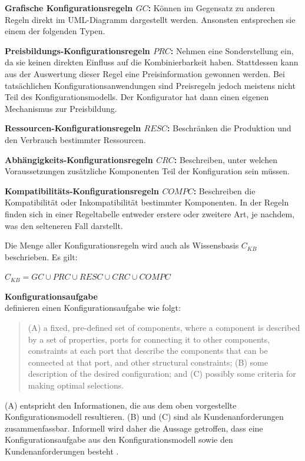 \documentclass[12pt,a4paper,bibliography=totocnumbered,listof=totoc]{scrartcl}
\begin{document}
\begin{compactitem}
\item \textbf{Grafische Konfigurationsregeln $GC$:} Können im Gegensatz zu anderen Regeln direkt im UML-Diagramm dargestellt werden. Ansonsten entsprechen sie einem der folgenden Typen.
\item \textbf{Preisbildungs-Konfigurationsregeln $PRC$:} Nehmen eine Sonderstellung ein, da sie keinen direkten Einfluss auf die Kombinierbarkeit haben. Stattdessen kann aus der Auswertung dieser Regel eine Preisinformation gewonnen werden. Bei tatsächlichen Konfigurationsanwendungen sind Preisregeln jedoch meistens nicht Teil des Konfigurationsmodells. Der Konfigurator hat dann einen eigenen Mechanismus zur Preisbildung.
\item \textbf{Ressourcen-Konfigurationsregeln $RESC$:} Beschränken die Produktion und den Verbrauch bestimmter Ressourcen.
\item \textbf{Abhängigkeits-Konfigurationsregeln $CRC$:} Beschreiben, unter welchen Voraussetzungen zusätzliche Komponenten Teil der Konfiguration sein müssen.
\item \textbf{Kompatibilitäts-Konfigurationsregeln $COMPC$:} Beschreiben die Kompatibilität  oder Inkompatibilität bestimmter Komponenten. In der Regeln finden sich in einer Regeltabelle entweder erstere oder zweitere Art, je nachdem, was den selteneren Fall darstellt.
\end{compactitem}

Die Menge aller Konfigurationsregeln wird auch als Wissensbasis $C_{KB}$ beschrieben. Es gilt:

 $C_{KB} = GC \cup PRC \cup RESC \cup CRC \cup COMPC$

\textbf{Konfigurationsaufgabe}\\
\citet{mittal89} definieren einen Konfigurationsaufgabe wie folgt:
\begin{quote}
(A) a fixed, pre-defined set of components, where a component is described by a set of properties, ports for connecting it to other components, constraints at each port that describe the components that can be connected at that port, and other structural constraints; (B) some description of the desired configuration; and (C) possibly some criteria for making optimal selections.
\end{quote}
(A) entspricht den Informationen, die aus dem oben vorgestellte Konfigurationsmodell resultieren. (B) und (C) sind als Kundenanforderungen zusammenfassbar. Informell wird daher die Aussage getroffen, dass eine Konfigurationsaufgabe aus den Konfigurationsmodell sowie den Kundenanforderungen besteht \citep{felferning14}.
\end{document}
